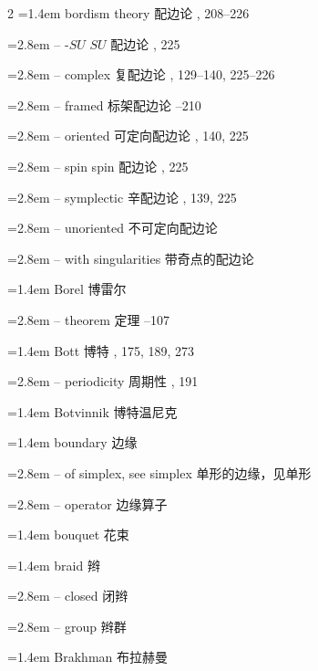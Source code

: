 \begin{multicols}{2}
\noindent\hangindent=1.4em bordism theory \quad 配边论 , 208--226\par
\noindent\hangindent=2.8em -- -$SU$ \quad $SU$ 配边论 , 225\par
\noindent\hangindent=2.8em -- complex \quad 复配边论 , 129--140, 225--226\par
\noindent\hangindent=2.8em -- framed \quad 标架配边论 --210\par
\noindent\hangindent=2.8em -- oriented \quad 可定向配边论 , 140, 225\par
\noindent\hangindent=2.8em -- spin \quad spin 配边论 , 225\par
\noindent\hangindent=2.8em -- symplectic \quad 辛配边论 , 139, 225\par
\noindent\hangindent=2.8em -- unoriented \quad 不可定向配边论 \par
\noindent\hangindent=2.8em -- with singularities \quad 带奇点的配边论 \par
\noindent\hangindent=1.4em Borel \quad 博雷尔 \par
\noindent\hangindent=2.8em -- theorem \quad 定理 --107\par
\noindent\hangindent=1.4em Bott \quad 博特 , 175, 189, 273\par
\noindent\hangindent=2.8em -- periodicity \quad 周期性 , 191\par
\noindent\hangindent=1.4em Botvinnik \quad 博特温尼克 \par
\noindent\hangindent=1.4em boundary \quad 边缘 \quad\par
\noindent\hangindent=2.8em -- of simplex, see simplex \quad 单形的边缘，见单形 \quad\par
\noindent\hangindent=2.8em -- operator \quad 边缘算子 \par
\noindent\hangindent=1.4em bouquet \quad 花束 \par
\noindent\hangindent=1.4em braid \quad 辫 \quad\par
\noindent\hangindent=2.8em -- closed \quad 闭辫 \par
\noindent\hangindent=2.8em -- group \quad 辫群 \par
\noindent\hangindent=1.4em Brakhman \quad 布拉赫曼 \par

\end{multicols}

